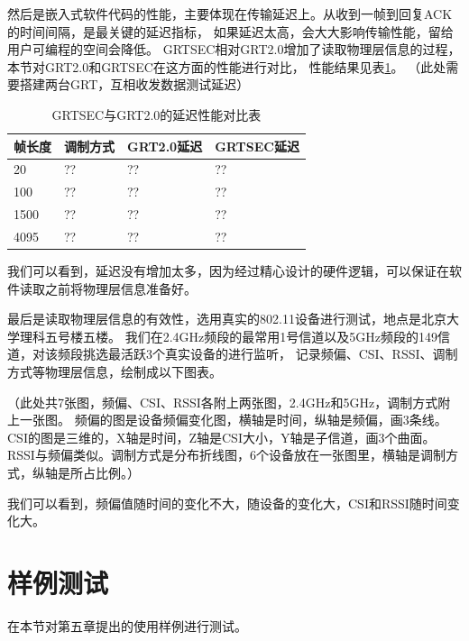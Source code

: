   然后是嵌入式软件代码的性能，主要体现在传输延迟上。从收到一帧到回复ACK的时间间隔，是最关键的延迟指标，
  如果延迟太高，会大大影响传输性能，留给用户可编程的空间会降低。
  GRTSEC相对GRT2.0增加了读取物理层信息的过程，本节对GRT2.0和GRTSEC在这方面的性能进行对比，
  性能结果见表\ref{tab:envaluate_grtsec_latency}。
  （此处需要搭建两台GRT，互相收发数据测试延迟）
  \begin{table}[!hbp]
  \centering
  \caption{GRTSEC与GRT2.0的延迟性能对比表}
  \label{tab:envaluate_grtsec_latency}
    \begin{tabular}{|l|l|l|l|} \hline
    帧长度 & 调制方式 & GRT2.0延迟 & GRTSEC延迟 \\ \hline
    20 & ?? & ?? & ?? \\ \hline
    100 & ?? & ?? & ?? \\ \hline
    1500 & ?? & ?? & ?? \\ \hline
    4095 & ?? & ?? & ?? \\ \hline
    \end{tabular}
  \end{table}

  我们可以看到，延迟没有增加太多，因为经过精心设计的硬件逻辑，可以保证在软件读取之前将物理层信息准备好。

  最后是读取物理层信息的有效性，选用真实的802.11设备进行测试，地点是北京大学理科五号楼五楼。
  我们在2.4GHz频段的最常用1号信道以及5GHz频段的149信道，对该频段挑选最活跃3个真实设备的进行监听，
  记录频偏、CSI、RSSI、调制方式等物理层信息，绘制成以下图表。

  （此处共7张图，频偏、CSI、RSSI各附上两张图，2.4GHz和5GHz，调制方式附上一张图。
  频偏的图是设备频偏变化图，横轴是时间，纵轴是频偏，画3条线。
  CSI的图是三维的，X轴是时间，Z轴是CSI大小，Y轴是子信道，画3个曲面。
  RSSI与频偏类似。调制方式是分布折线图，6个设备放在一张图里，横轴是调制方式，纵轴是所占比例。）

  我们可以看到，频偏值随时间的变化不大，随设备的变化大，CSI和RSSI随时间变化大。

  \section{样例测试}\label{sec:envaluation_demo}
  在本节对第五章提出的使用样例进行测试。
